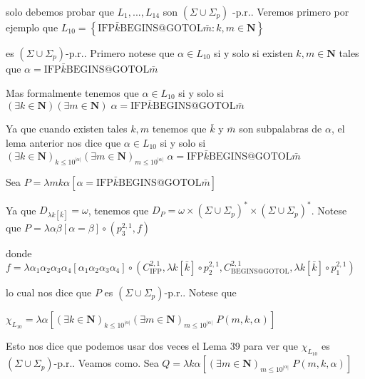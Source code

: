 solo debemos probar que \(L_{1},...,L_{14}\) son \((\Sigma \cup \Sigma _{p})\) -p.r.. Veremos primero por ejemplo que
\(\displaystyle L_{10}=\left\{ \mathrm{IFP}\bar{k}\mathrm{BEGINS}@\mathrm{GOTOL}\bar{m} :k,m\in \mathbf{N}\right\} \)

es \((\Sigma \cup \Sigma _{p})\)-p.r.. Primero notese que \(\alpha \in L_{10}\) si y solo si existen \(k,m\in \mathbf{N}\) tales que
\(\displaystyle \alpha =\mathrm{IFP}\bar{k}\mathrm{BEGINS}@\mathrm{GOTOL}\bar{m} \)

Mas formalmente tenemos que \(\alpha \in L_{10}\) si y solo si
\(\displaystyle (\exists k\in \mathbf{N})(\exists m\in \mathbf{N})\;\alpha =\mathrm{IFP}\bar{ k}\mathrm{BEGINS}@\mathrm{GOTOL}\bar{m} \)

Ya que cuando existen tales \(k,m\) tenemos que \(\bar{k}\) y \(\bar{m}\) son subpalabras de \(\alpha \), el lema anterior nos dice que \(\alpha \in L_{10}\) si y solo si
\(\displaystyle (\exists k\in \mathbf{N})_{k\leq 10^{\left\vert \alpha \right\vert }}(\exists m\in \mathbf{N})_{m\leq 10^{\left\vert \alpha \right\vert }}\;\alpha =\mathrm{IFP}\bar{k}\mathrm{BEGINS}@\mathrm{GOTOL}\bar{m} \)

Sea
\(\displaystyle P=\lambda mk\alpha \left[ \alpha =\mathrm{IFP}\bar{k}\mathrm{BEGINS}@\mathrm{ GOTOL}\bar{m}\right] \)

Ya que \(D_{\lambda k\left[ \bar{k}\right] }=\omega \), tenemos que \( D_{P}=\omega \times (\Sigma \cup \Sigma _{p})^{\ast }\times (\Sigma \cup \Sigma _{p})^{\ast }\). Notese que
\(\displaystyle P=\lambda \alpha \beta \left[ \alpha =\beta \right] \circ \left( p_{3}^{2,1},f\right) \)

donde
\(\displaystyle f=\lambda \alpha _{1}\alpha _{2}\alpha _{3}\alpha _{4}\left[ \alpha _{1}\alpha _{2}\alpha _{3}\alpha _{4}\right] \circ \left( C_{\mathrm{IFP} }^{2,1},\lambda k\left[ \bar{k}\right] \circ p_{2}^{2,1},C_{\mathrm{BEGINS}@ \mathrm{GOTOL}}^{2,1},\lambda k\left[ \bar{k}\right] \circ p_{1}^{2,1}\right) \)

lo cual nos dice que \(P\) es \((\Sigma \cup \Sigma _{p})\)-p.r..
Notese que

\(\displaystyle \chi _{L_{10}}=\lambda \alpha \left[ (\exists k\in \mathbf{N})_{k\leq 10^{\left\vert \alpha \right\vert }}(\exists m\in \mathbf{N})_{m\leq 10^{\left\vert \alpha \right\vert }}\;P(m,k,\alpha )\right] \)

Esto nos dice que podemos usar dos veces el Lema 39 para ver que \(\chi _{L_{10}}\) es \((\Sigma \cup \Sigma _{p})\)-p.r.. Veamos como. Sea
\(\displaystyle Q=\lambda k\alpha \left[ (\exists m\in \mathbf{N})_{m\leq 10^{\left\vert \alpha \right\vert }}\;P(m,k,\alpha )\right] \)

